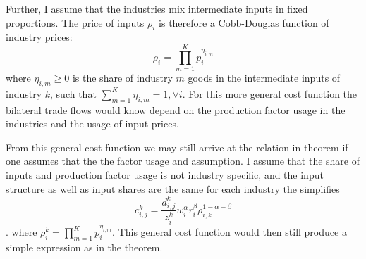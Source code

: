   Further, I assume that the industries mix intermediate inputs in fixed proportions.
   The price of inputs $\rho_i$ is therefore a Cobb-Douglas function of industry prices:
\[\rho_{i}= \prod\limits_{m=1}^{K}  p^{\eta_{i,m}}_{i}  \] where $\eta_{i,m} \geq 0$ is the share of industry $m$ goods in the intermediate inputs of industry $k$, such that $\sum_{m=1}^K \eta_{i,m}=1, \forall i$.  For this more general cost function the bilateral trade flows would know depend on the production factor usage in the industries and the usage of input prices. \par From this general cost function we may still arrive at the relation in theorem if one assumes that the the factor usage and  assumption. I assume that the share of inputs and production factor usage is not industry specific, and the input structure as well as input shares are the same for each industry the simplifies \[ c^k_{i,j}=\frac{d^k_{i,j}}{z_{i}^k } w^{\alpha}_i r^{\beta}_i \rho^{1-\alpha-\beta}_{i,k} \]. where
$\rho^k_{i}= \prod\limits_{m=1}^{K}  p^{\eta_{i,m}}_{i}  $.
 This general cost function would then still produce a simple expression as in the theorem.
\endinput
